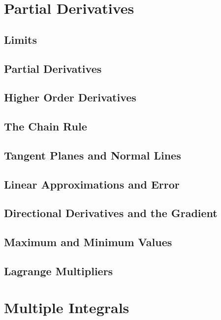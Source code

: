 \documentclass[12pt,letterpaper, openany]{book}
\begin{document}
\chapter{Partial Derivatives}
\section{Limits}

\section{Partial Derivatives}

\section{Higher Order Derivatives}

\section{The Chain Rule}

\section{Tangent Planes and Normal Lines}

\section{Linear Approximations and Error}

\section{Directional Derivatives and the Gradient}

\setcounter{section}{8}
\section{Maximum and Minimum Values}

\section{Lagrange Multipliers}


\chapter{Multiple Integrals}
\end{document}
